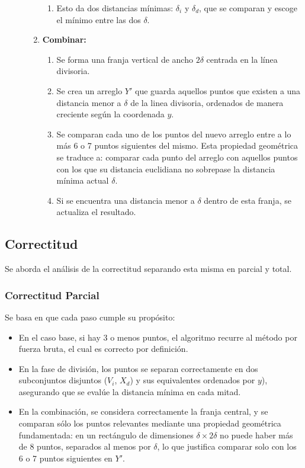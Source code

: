 \documentclass[informe.tex]{subfiles}
\begin{document}
\begin{description}
\begin{enumerate}
\begin{enumerate}
			            \item Esto da dos distancias mínimas: $\delta_i$ y $\delta_d$, que se
			                  comparan y escoge el mínimo entre las dos $\delta$.
		            \end{enumerate}
		      \item \textbf{Combinar:}
		            \begin{enumerate}
			            \item Se forma una franja vertical de ancho $2\delta$ centrada en la línea divisoria.
			            \item Se crea un arreglo $Y'$ que guarda aquellos puntos que existen a una distancia menor
			                  a $\delta$ de la linea divisoria, ordenados de manera creciente según la coordenada $y$.
			            \item Se comparan cada uno de los puntos del nuevo arreglo entre a lo más
			                  6 o 7 puntos siguientes del mismo. Esta propiedad geométrica se
			                  traduce a: comparar cada punto del arreglo con aquellos puntos con
			                  los que su distancia euclidiana no sobrepase la distancia mínima
			                  actual $\delta$.
			            \item Si se encuentra una distancia menor a $\delta$ dentro de esta franja,
			                  se actualiza el resultado.
		            \end{enumerate}
	      \end{enumerate}
\end{description}

\subsection{Correctitud}

Se aborda el análisis de la correctitud separando esta misma en parcial y total.

\subsubsection{\textbf{Correctitud Parcial}}
Se basa en que cada paso cumple su propósito:

\begin{itemize}
	\item  En el caso base, si hay 3 o menos puntos, el algoritmo recurre al método por fuerza
	      bruta, el cual es correcto por definición.
	\item En la fase de división, los puntos se separan correctamente en dos subconjuntos disjuntos
	      ($V_i$, $X_d$) y sus equivalentes ordenados por $y$), asegurando que se evalúe la
	      distancia mínima en cada mitad.
	\item En la combinación, se considera correctamente la franja central, y se comparan sólo
	      los  puntos relevantes mediante una propiedad geométrica fundamentada: en un
	      rectángulo de dimensiones $\delta \times 2\delta$ no puede haber más de 8 puntos,
	      separados al menos por $\delta$, lo que justifica comparar solo con los 6 o 7 puntos
	      siguientes en $Y'$.
\end{itemize}
\end{document}
